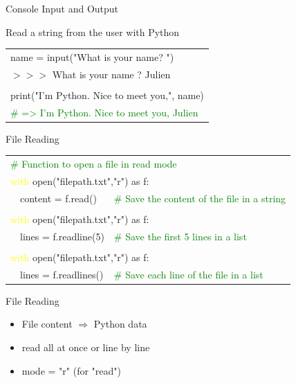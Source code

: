 \documentclass[serif, aspectratio=169]{beamer}
\newcommand{\tred}[1]{\textcolor{red!50}{#1}}
\newcommand{\tgreen}[1]{\textcolor{green}{#1}}
\newcommand{\tyellow}[1]{\textcolor{yellow}{#1}}
\newenvironment{CLI} %
    {
    \noindent
    \ttfamily 
    \footnotesize
    \begin{tcolorbox}[colback=gray!150,colframe=black]
    \color{white}
    \begin{tabular}{p{4.5cm}p{7.5cm}}
    }
    { 
    \end{tabular}
    \end{tcolorbox}
    }
\begin{document}
\begin{frame}{Console Input and Output}
    \begin{block}{Read a string from the user with Python}
        \vspace{2pt}
        \begin{CLI}
            \multicolumn{2}{l}{name = input("What is your name? ")} \\
            \multicolumn{2}{l}{$>$$>$$>$ What is your name ? \tred{Julien}} \\
            \pause
            & \\
            \multicolumn{2}{l}{print("I'm Python. Nice to meet you,", name)} \\
            \multicolumn{2}{l}{\tgreen{\# => I'm Python. Nice to meet you, Julien}} \\
        \end{CLI}
    \end{block}
\end{frame}

\begin{frame}{File Reading}
    \begin{CLI}
        \multicolumn{2}{l}{\tgreen{\# Function to open a file in read mode}} \\
        \multicolumn{2}{l}{\tyellow{with} open("filepath.txt","r") as f:} \\
        ~~content = f.read() & \tgreen{\# Save the content of the file in a string} \\
        \pause
        & \\
        \multicolumn{2}{l}{\tyellow{with} open("filepath.txt","r") as f:} \\
        ~~lines = f.readline(5) & \tgreen{\# Save the first 5 lines in a list} \\
        \pause
        & \\
        \multicolumn{2}{l}{\tyellow{with} open("filepath.txt","r") as f:} \\
        ~~lines = f.readlines() & \tgreen{\# Save each line of the file in a list} \\
    \end{CLI}
    \pause
    \begin{block}{File Reading}
        \begin{itemize}
            \item File content $\Rightarrow$ Python data
            \item read all at once or line by line 
            \item mode = "r" (for "read")
        \end{itemize}
    \end{block}
\end{frame}
\end{document}
